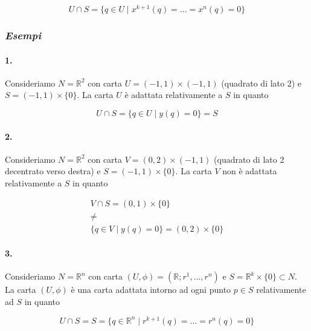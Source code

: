 \begin{equation}
	U \cap S = \{ q \in U \mid x^{k+1}(q) = \dots = x^{n}(q) = 0 \}
\end{equation}

\subsubsection{\textit{Esempi}}

\paragraph{1.}

Consideriamo $ N = \mathbb{R}^{2} $ con carta $ U = (-1,1) \times (-1,1) $ (quadrato di lato 2) e $ S = (-1,1) \times \{0\} $. La carta $ U $ è adattata relativamente a $ S $ in quanto

\begin{equation}
	U \cap S = \{ q \in U \mid y(q) = 0 \} = S
\end{equation}

\paragraph{2.}

Consideriamo $ N = \mathbb{R}^{2} $ con carta $ V = (0,2) \times (-1,1) $ (quadrato di lato 2 decentrato verso destra) e $ S = (-1,1) \times \{0\} $. La carta $ V $ non è adattata relativamente a $ S $ in quanto

\begin{gather}
	V \cap S = (0,1) \times \{0\}\nonumber\\
	\neq\\
	\{ q \in V \mid y(q) = 0 \} = (0,2) \times \{0\}\nonumber
\end{gather}

\paragraph{3.}

Consideriamo $ N = \mathbb{R}^{n} $ con carta $ (U,\phi) = (\mathbb{R};r^{1},\dots,r^{n}) $ e $ S = \mathbb{R}^{k} \times \{0\} \subset N $. La carta $ (U,\phi) $ è una carta adattata intorno ad ogni punto $ p \in S $ relativamente ad $ S $ in quanto

\begin{equation}
	U \cap S = S = \{ q \in \mathbb{R}^{n} \mid r^{k+1}(q) = \dots = r^{n}(q) = 0 \}
\end{equation}

